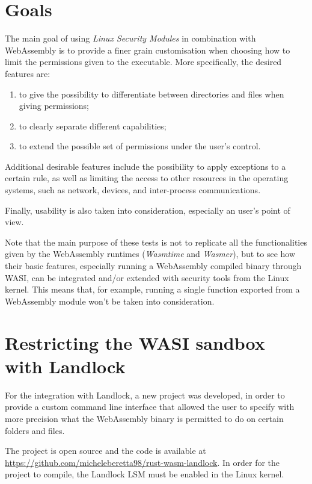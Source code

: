 \section{Goals}

The main goal of using \textit{Linux Security Modules} in combination with WebAssembly
is to provide a finer grain customisation when choosing how to limit the permissions given
to the executable. More specifically, the desired features are:
\begin{enumerate}
  \item to give the possibility to differentiate between directories and files when giving permissions;
  \item to clearly separate different capabilities;
  \item to extend the possible set of permissions under the user's control.
\end{enumerate}

Additional desirable features include the possibility to apply exceptions to a certain rule, as well
as limiting the access to other resources in the operating systems, such as network, devices, and
inter-process communications.

Finally, usability is also taken into consideration, especially an user's point of view.

Note that the main purpose of these tests is not to replicate all the functionalities given by
the WebAssembly runtimes (\textit{Wasmtime} and \textit{Wasmer}), but to see how their basic features,
especially running a WebAssembly compiled binary through WASI, can be integrated and/or extended with
security tools from the Linux kernel.
This means that, for example, running a single function exported from a WebAssembly module won't be taken
into consideration.

\section{Restricting the WASI sandbox with Landlock}

For the integration with Landlock, a new project was developed, in order to provide
a custom command line interface that allowed the user to specify with more precision what
the WebAssembly binary is permitted to do on certain folders and files.

The project is open source and the code is available at \url{https://github.com/micheleberetta98/rust-wasm-landlock}.
In order for the project to compile, the Landlock LSM must be enabled in the Linux kernel.

